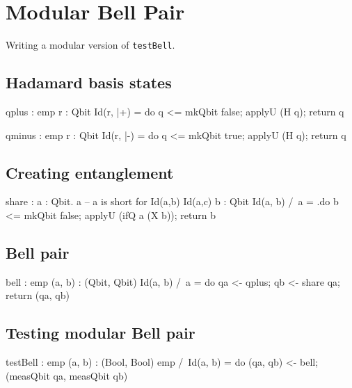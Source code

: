 \documentclass[acmsmall,nonacm,timestamp]{acmart}
\begin{document}
\newpage



\newpage

\newpage

\appendix

\section{Modular Bell Pair}
\label{app:mbp}
Writing a modular version of \texttt{testBell}.

\subsection{Hadamard basis states}
\begin{QCode}
qplus : {emp} r : Qbit {Id(r, |+\>)}
      = do q <= mkQbit false;
           applyU (H q);
           return q

qminus : {emp} r : Qbit {Id(r, |-\>)}
       = do q <= mkQbit true;
            applyU (H q);
            return q
\end{QCode}

\subsection{Creating entanglement}
\begin{QCode}
share : \Pi a : Qbit.
        {a \in {|+\>, |-\>}}   -- a  is short for Id(a,b) \/ Id(a,c)
           b : Qbit
        {Id(a, b) /\ a }
      = \a.do b <= mkQbit false;
              applyU (ifQ a (X b));
              return b
\end{QCode}

\subsection{Bell pair}
\begin{QCode}
bell : {emp} (a, b) : (Qbit, Qbit) {Id(a, b) /\ a }
     = do qa <- qplus;
          qb <- share qa;
          return (qa, qb)
\end{QCode}

\subsection{Testing modular Bell pair}
\begin{QCode}
testBell : {emp} (a, b) : (Bool, Bool) {emp /\ Id(a, b)}
         = do (qa, qb) <- bell;
              (measQbit qa, measQbit qb)
\end{QCode}
\end{document}
